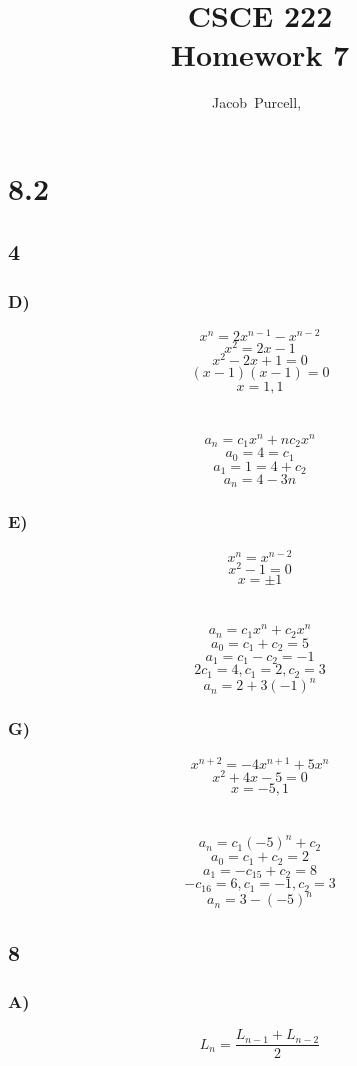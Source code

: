 \documentclass[journal]{IEEEtran}
\begin{document}
\title{CSCE 222 \\ Homework 7}

\author{Jacob~Purcell,~}

\maketitle

\section*{8.2}
\subsection*{4}
\subsubsection*{D)}
$$x^n = 2x^{n-1} - x^{n-2}$$
$$x^2 = 2x - 1$$
$$x^2 - 2x + 1 = 0$$
$$(x - 1)(x - 1) = 0$$
$$x = 1,1$$
\\\\
$$a_n = c_1x^n + nc_2x^n$$
$$a_0 = 4 = c_1$$
$$a_1 = 1 = 4 + c_2$$
$$\boxed{a_n = 4 - 3n}$$

\subsubsection*{E)}
$$x^n = x^{n-2}$$
$$x^2 - 1 = 0$$
$$x = \pm 1$$
\\\\
$$a_n = c_1x^n + c_2x^n$$
$$a_0 = c_1 + c_2 = 5$$
$$a_1 = c_1 - c_2 = -1$$
$$2c_1 = 4, c_1 = 2, c_2 = 3$$
$$\boxed{a_n = 2 + 3(-1)^n}$$

\subsubsection*{G)}
$$x^{n+2} = -4x^{n+1} + 5x^n$$
$$x^2 + 4x - 5 = 0$$
$$x = -5, 1$$
\\\\
$$a_n = c_1(-5)^n + c_2$$
$$a_0 = c_1 + c_2 = 2$$
$$a_1 = -c_15 + c_2 = 8$$
$$-c_16 = 6, c_1 = -1, c_2 = 3$$
$$a_n = 3 - (-5)^n $$

\subsection*{8}
\subsubsection*{A)}
$$\boxed{L_n = \frac{L_{n-1} + L_{n-2}}{2}}$$
\end{document}
